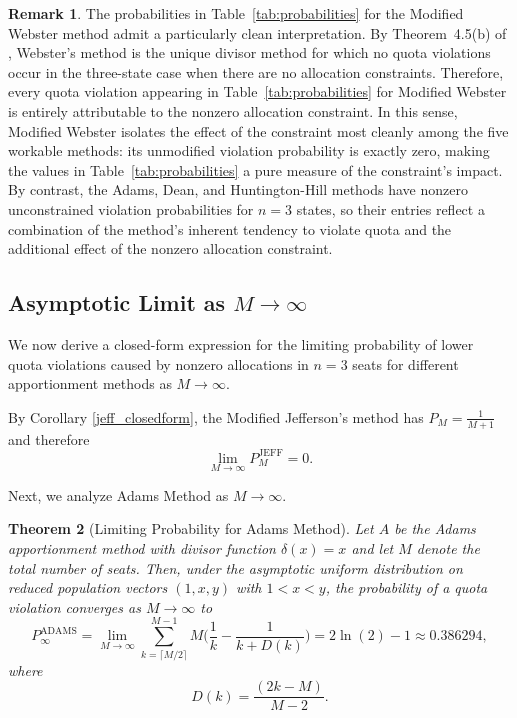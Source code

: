 \documentclass[11pt]{article}
\newtheorem{theorem}{Theorem}[section]
\theoremstyle{definition}
\newtheorem{remark}[theorem]{Remark}
\theoremstyle{definition}
\begin{document}
 \begin{remark}
The probabilities in Table~\ref{tab:probabilities} for the Modified Webster method admit a particularly clean interpretation. By Theorem~4.5(b) of \parencite{Self}, Webster's method is 
the unique divisor method for which no quota violations occur in the three-state case when there are no allocation constraints. Therefore, every quota violation appearing in Table~\ref{tab:probabilities} for Modified Webster is entirely attributable to the nonzero allocation constraint. In this sense, Modified Webster isolates the effect of the constraint most cleanly among the five workable methods: its unmodified violation probability is exactly zero, making the values in Table~\ref{tab:probabilities} a pure measure of the constraint's impact. By contrast, the Adams, Dean, and Huntington-Hill methods have nonzero unconstrained violation probabilities for $n = 3$ states, so their entries reflect a combination of the method's inherent tendency to violate quota and the additional effect of the nonzero allocation constraint.
\end{remark}

\subsection{Asymptotic Limit as $M \to \infty$}
We now derive a closed-form expression for the limiting probability of lower quota violations caused by nonzero allocations in $n=3$ seats for different apportionment methods as $M \to \infty$. 

By Corollary \ref{jeff_closedform}, the Modified Jefferson's method has $P_M = \frac{1}{M+1}$ and therefore $$ \lim_{M\to\infty} P_M^{\mathrm{JEFF}} = 0.$$

Next, we analyze Adams Method as $M\to \infty$. 

\begin{theorem}[Limiting Probability for Adams Method]
\label{thm:adams_limit}
Let $A$ be the Adams apportionment method with divisor function $\delta(x)=x$ and let $M$ denote the total number of seats. Then, under the asymptotic uniform distribution on reduced population vectors $(1,x,y)$ with $1<x<y$, the probability of a quota violation converges as $M\to\infty$ to 
$$
P_\infty^{\text{ADAMS}} = \lim_{M \to \infty} \sum_{k=\lceil M/2 \rceil}^{M-1} M \Biggl( \frac{1}{k} - \frac{1}{k + D(k)} \Biggr) = 2\ln(2) -1\approx 0.386294,
$$
where
$$
D(k) = \frac{(2k-M)}{M-2}.
$$
\end{theorem}
\end{document}
